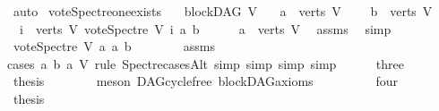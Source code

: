 \begin{isabellebody}
\ auto\isanewline
{}\isamarkupfalse%
%
\endisatagproof
{\isafoldproof}%
%
\isadelimproof
\isanewline
%
\endisadelimproof
\isanewline
\isanewline
{}\isamarkupfalse%
\ vote{\isacharunderscore}{\kern0pt}Spectre{\isacharunderscore}{\kern0pt}one{\isacharunderscore}{\kern0pt}exists{\isacharcolon}{\kern0pt}\isanewline
\ \ \ {\isachardoublequoteopen}blockDAG\ V{\isachardoublequoteclose}\isanewline
\ \ \ {\isachardoublequoteopen}a\ {\isasymin}\ verts\ V{\isachardoublequoteclose}\ \isanewline
\ \ \ {\isachardoublequoteopen}b\ {\isasymin}\ verts\ V{\isachardoublequoteclose}\ \isanewline
{}\ {\isachardoublequoteopen}{\isasymexists}\ i\ {\isasymin}\ verts\ V{\isachardot}{\kern0pt}\ vote{\isacharunderscore}{\kern0pt}Spectre\ V\ i\ a\ b\ {\isasymnoteq}\ {}{\isachardoublequoteclose}\isanewline
%
\isadelimproof
%
\endisadelimproof
%
\isatagproof
{}\isamarkupfalse%
\isanewline
\ \ \isamarkupfalse%
\ {\isachardoublequoteopen}a\ {\isasymin}\ verts\ V{\isachardoublequoteclose}\ \isamarkupfalse%
\ assms{\isacharparenleft}{\kern0pt}{}{\isacharparenright}{\kern0pt}\ \isamarkupfalse%
\ simp\isanewline
\ \ \isamarkupfalse%
\ {\isachardoublequoteopen}vote{\isacharunderscore}{\kern0pt}Spectre\ V\ a\ a\ b\ {\isasymnoteq}\ {}{\isachardoublequoteclose}\isanewline
\ \ \ \ \isamarkupfalse%
\ assms\isanewline
\ \ \isamarkupfalse%
{\isacharparenleft}{\kern0pt}cases\ a\ b\ a\ V\ rule{\isacharcolon}{\kern0pt}\ Spectre{\isacharunderscore}{\kern0pt}casesAlt{\isacharcomma}{\kern0pt}\ simp{\isacharcomma}{\kern0pt}\ simp{\isacharcomma}{\kern0pt}\ simp{\isacharcomma}{\kern0pt}\ simp{\isacharparenright}{\kern0pt}\isanewline
\ \ \ \ \isamarkupfalse%
\ three\isanewline
\ \ \ \ \isamarkupfalse%
\ \isamarkupfalse%
\ {\isacharquery}{\kern0pt}thesis\isanewline
\ \ \ \ \ \ \isamarkupfalse%
\ {\isacharparenleft}{\kern0pt}meson\ DAG{\isachardot}{\kern0pt}cycle{\isacharunderscore}{\kern0pt}free\ blockDAG{\isachardot}{\kern0pt}axioms{\isacharparenleft}{\kern0pt}{}{\isacharparenright}{\kern0pt}{\isacharparenright}{\kern0pt}\ \isanewline
\ \ \isamarkupfalse%
\isanewline
\ \ \ \ \isamarkupfalse%
\ four\isanewline
\ \ \ \ \isamarkupfalse%
\ \isamarkupfalse%
\ {\isacharquery}{\kern0pt}thesis\isanewline
\ \ \ \ \ \ \isamarkupfalse%

\end{isabellebody}
